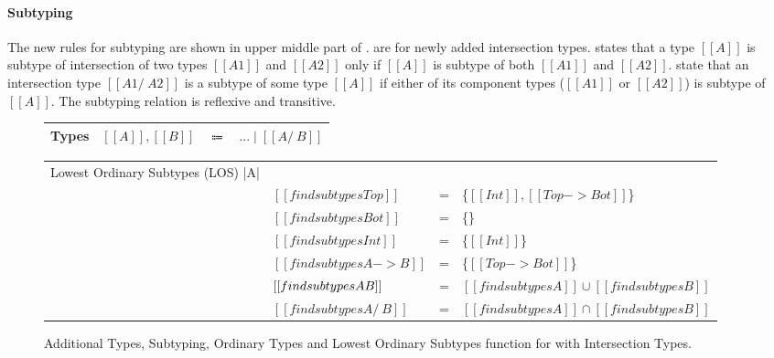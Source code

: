 \paragraph{Subtyping}
The new rules for subtyping are shown in upper middle part of
.   are for newly
added intersection types.  states that a type $[[A]]$ is
subtype of intersection of two types $[[A1]]$ and $[[A2]]$ only if
$[[A]]$ is subtype of both $[[A1]]$ and $[[A2]]$.  state that an intersection type $[[A1 /\ A2]]$ is a subtype
of some type $[[A]]$ if either of its component types ($[[A1]]$ or
$[[A2]]$) is subtype of $[[A]]$. The subtyping relation is reflexive
and transitive.

\begin{figure}[t]
  \begin{small}
    \centering
    \begin{tabular}{lrcl} \toprule
      Types & $[[A]], [[B]]$ & $\Coloneqq$ & $ ... \mid [[A /\ B]] $ \\
      \bottomrule
    \end{tabular}
  \end{small}
  \medskip
    \begin{small}
    \centering
  \end{small}
  \medskip
    \begin{small}
    \centering
  \end{small}
  \medskip
    \centering
    \begin{tabular}{llcl}
      \toprule
      Lowest Ordinary Subtypes (LOS) |A| &  & & \\
     & $[[findsubtypes Top]]$ & = & \{$ [[Int]], [[Top -> Bot]]$\}  \\
     & $[[findsubtypes Bot]]$ & = & \{\}  \\
     & $[[findsubtypes Int]]$ & = & \{$ [[Int]] $\}  \\
     & $[[findsubtypes A -> B]]$ & = & \{$ [[Top -> Bot]] $\}  \\
     & $[[findsubtypes A \/ B]]$ & = & $ [[findsubtypes A]] \cup [[findsubtypes B]] $\\
     & $[[findsubtypes A /\ B]]$ & = & $ [[findsubtypes A]] \cap [[findsubtypes B]] $\\
      \bottomrule
    \end{tabular}
  \caption{Additional Types, Subtyping, Ordinary Types and Lowest Ordinary Subtypes function for \cal with Intersection Types.}
  \label{fig:inter:system}
\end{figure}

